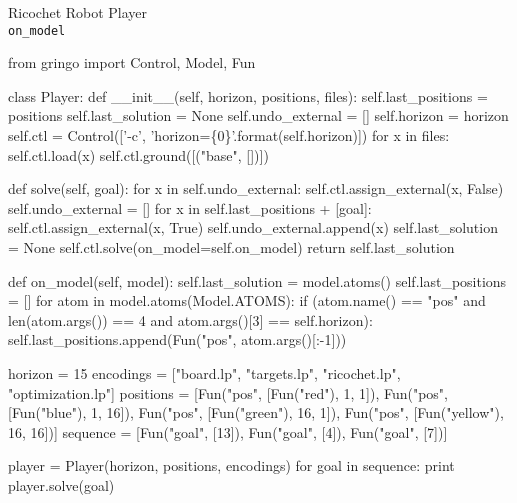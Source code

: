 \begin{frame}[fragile]{Ricochet Robot Player\\[-5pt]\large\texttt{on\_model}}
\Tiny\vspace{-15pt}
\begin{semiverbatim}
from gringo import Control, Model, Fun

class Player:
    def __init__(self, horizon, positions, files):
        self.last_positions = positions
        self.last_solution = None
        self.undo_external = []
        self.horizon = horizon
        self.ctl = Control(['-c', 'horizon=\{0\}'.format(self.horizon)])
        for x in files:
            self.ctl.load(x)
        self.ctl.ground([("base", [])])

    def solve(self, goal):
        for x in self.undo_external:
            self.ctl.assign_external(x, False)
        self.undo_external = []
        for x in self.last_positions + [goal]:
            self.ctl.assign_external(x, True)
            self.undo_external.append(x)
        self.last_solution = None
        self.ctl.solve(on_model=self.on_model)
        return self.last_solution

\alert{    def on_model(self, model):
        self.last_solution = model.atoms()
        self.last_positions = []
        for atom in model.atoms(Model.ATOMS):
            if (atom.name() == "pos" and len(atom.args()) == 4 and atom.args()[3] == self.horizon):
                self.last_positions.append(Fun("pos", atom.args()[:-1]))}

horizon   = 15
encodings = ["board.lp", "targets.lp", "ricochet.lp", "optimization.lp"]
positions = [Fun("pos", [Fun("red"),     1,  1]), Fun("pos", [Fun("blue"),    1, 16]),
             Fun("pos", [Fun("green"),  16,  1]), Fun("pos", [Fun("yellow"), 16, 16])]
sequence  = [Fun("goal", [13]), Fun("goal", [4]), Fun("goal", [7])]

player = Player(horizon, positions, encodings)
for goal in sequence:
    print player.solve(goal)
\end{semiverbatim}
\end{frame}
